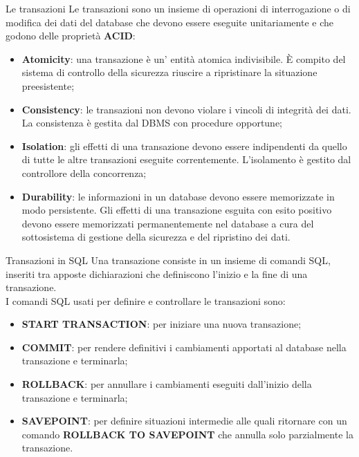 \begin{frame}[fragile]{Le transazioni}
Le transazioni sono un insieme di operazioni di interrogazione o di modifica dei dati del database che devono essere eseguite unitariamente e che godono delle propriet\`a \textbf{ACID}:
\begin{itemize}[<+->]
    \item \textbf{Atomicity}: una transazione \`e un' entit\`a atomica indivisibile. \`E compito del sistema di controllo della sicurezza riuscire a ripristinare la situazione preesistente;
    \item \textbf{Consistency}: le transazioni non devono violare i vincoli di integrit\`a dei dati. La consistenza \`e gestita dal DBMS con procedure opportune;
    \item \textbf{Isolation}: gli effetti di una transazione devono essere indipendenti da quello di tutte le altre transazioni eseguite correntemente. L'isolamento \`e gestito dal controllore della concorrenza;
    \item \textbf{Durability}: le informazioni in un database devono essere memorizzate in modo persistente. Gli effetti di una transazione esguita con esito positivo devono essere memorizzati permanentemente nel database a cura del sottosistema di gestione della sicurezza e del ripristino dei dati.
\end{itemize}
\end{frame}
%
\begin{frame}{Transazioni in SQL}
Una transazione consiste in un insieme di comandi SQL, inseriti tra apposte dichiarazioni che definiscono l'inizio e la fine di una transazione.
\newline
\\I comandi SQL usati per definire e controllare le transazioni sono:
\begin{itemize}[<+->]
    \item \textbf{START TRANSACTION}: per iniziare una nuova transazione;
    \item \textbf{COMMIT}: per rendere definitivi i cambiamenti apportati al database nella transazione e terminarla;
    \item \textbf{ROLLBACK}: per annullare i cambiamenti eseguiti dall'inizio della transazione e terminarla;
    \item \textbf{SAVEPOINT}: per definire situazioni intermedie alle quali ritornare con un comando \textbf{ROLLBACK TO SAVEPOINT} che annulla solo parzialmente la transazione.
\end{itemize}
\end{frame}
